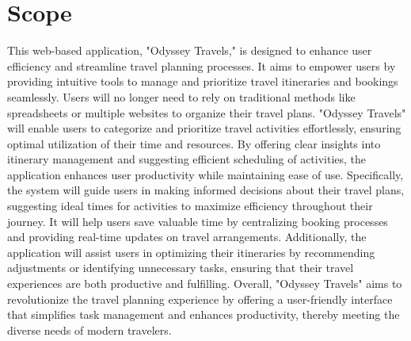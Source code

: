 \documentclass{scrreprt}
\begin{document}
\section{Scope}
This web-based application, "Odyssey Travels," is designed to enhance user efficiency and streamline travel planning processes. It aims to empower users by providing intuitive tools to manage and prioritize travel itineraries and bookings seamlessly. Users will no longer need to rely on traditional methods like spreadsheets or multiple websites to organize their travel plans.
"Odyssey Travels" will enable users to categorize and prioritize travel activities effortlessly, ensuring optimal utilization of their time and resources. By offering clear insights into itinerary management and suggesting efficient scheduling of activities, the application enhances user productivity while maintaining ease of use.
Specifically, the system will guide users in making informed decisions about their travel plans, suggesting ideal times for activities to maximize efficiency throughout their journey. It will help users save valuable time by centralizing booking processes and providing real-time updates on travel arrangements. Additionally, the application will assist users in optimizing their itineraries by recommending adjustments or identifying unnecessary tasks, ensuring that their travel experiences are both productive and fulfilling.
Overall, "Odyssey Travels" aims to revolutionize the travel planning experience by offering a user-friendly interface that simplifies task management and enhances productivity, thereby meeting the diverse needs of modern travelers.
\end{document}
